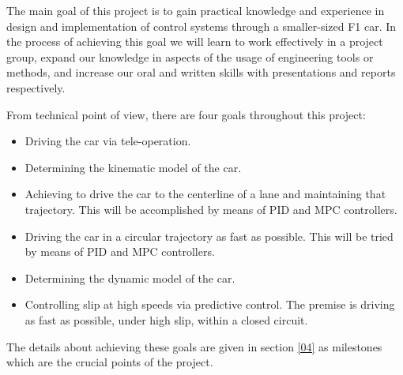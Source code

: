The main goal of this project is to gain practical knowledge and experience in
design and implementation of control systems through a smaller-sized F1 car. In
the process of achieving this goal we will learn to work effectively in a
project group, expand our knowledge in aspects of the usage of engineering tools
or methods, and increase our oral and written skills with presentations and
reports respectively.

From technical point of view, there are four goals throughout this project:

\begin{itemize}
  \item Driving the car via tele-operation.
  \item Determining the kinematic model of the car.
  \item Achieving to drive the car to the centerline of a lane and maintaining that trajectory.
    This will be accomplished by means of PID and MPC controllers.
  \item Driving the car in a circular trajectory as fast as possible.
    This will be tried by means of PID and MPC controllers.
  \item Determining the dynamic model of the car.
  \item Controlling slip at high speeds via predictive control. The premise is
    driving as fast as possible, under high slip, within a closed circuit.
\end{itemize}

The details about achieving these goals are given in section \ref{04} as milestones
which are the crucial points of the project.
